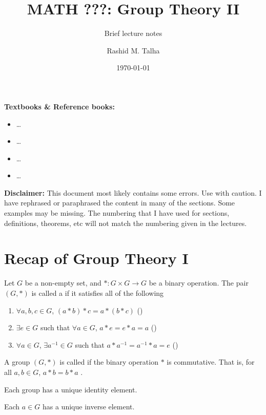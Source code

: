 \documentclass[11pt]{penrose}
\title{MATH ???: Group Theory II}
\subtitle{Brief lecture notes}
\author{Rashid M. Talha}
\affiliation{School of Natural Sciences, NUST}
\date{\today}
\begin{document}
\maketitle

\textbf{Textbooks \& Reference books:}
\begin{itemize}
    \item \dots
    \item \dots
    \item \dots
    \item \dots
\end{itemize}

\textbf{Disclaimer:} This document most likely contains some errors. Use with caution. I have rephrased or paraphrased the content in many of the sections. Some examples may be missing. The numbering that I have used for sections, definitions, theorems, etc will not match the numbering given in the lectures.

\section{Recap of Group Theory I}
\begin{ndfn}
    Let $G$ be a non-empty set, and $* : G \times G \to G$ be a binary operation. The pair $(G, *)$ is called a  if it satisfies all of the following
    \begin{enumerate}
        \item $\forall a, b, c \in G$, $(a * b) * c = a * (b * c)$ \hfill()
        \item $\exists e \in G$ such that $\forall a \in G$, $a * e = e * a = a$ \hfill()
        \item $\forall a \in G$, $\exists a^{-1} \in G$ such that $a * a^{-1} = a^{-1} * a = e$ \hfill()
    \end{enumerate}
\end{ndfn}

\begin{ndfn}
    A group $(G, *)$ is called  if the binary operation $*$ is commutative. That is, for all $a, b \in G$, $a * b = b * a$ .
\end{ndfn}

\begin{nthm}
    Each group has a unique identity element.
\end{nthm}

\begin{nthm}
    Each $a \in G$ has a unique inverse element.
\end{nthm}
\end{document}
